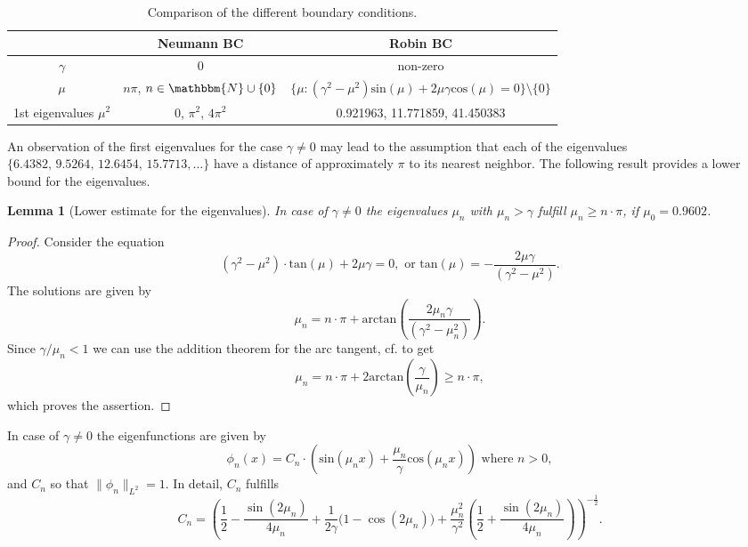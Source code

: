 \documentclass[a4paper,11pt]{article}
\theoremstyle{plain} %
\newtheorem{lemma}{Lemma}[section]
\theoremstyle{definition} %
\theoremstyle{remark} %
\theoremstyle{remark}
\begin{document}
\begin{table}[h!] 
\centering
{ \renewcommand{\arraystretch}{1.4}
\begin{tabular}{ccc}
\toprule
& \textbf{Neumann BC} & \textbf{Robin BC}\\
\midrule
$\gamma $ & 0 & non-zero\\
$\mu $ & $ n \pi$, $ n\in \mathbbm{N}\cup \{ 0 \} $ & $ \{ \mu : (\gamma^2  - \mu^2) \mathrm{sin}(\mu ) + 2 \mu \gamma \mathrm{cos}(\mu ) =0  \}\setminus \{ 0 \} $ \\
1st eigenvalues $\mu^2 $  & 0, $\pi^2 $, $ 4 \pi^2 $ & 0.921963, 11.771859, 41.450383 \\
\bottomrule
\end{tabular}}
\caption{Comparison of the different boundary conditions.}
\label{ComparisonBC}
\end{table}
An observation of the first eigenvalues for the case $\gamma \not= 0 $ may lead to the assumption that each of the eigenvalues $ \{ 6.4382,\, 9.5264,\, 12.6454,\, 15.7713,\dots \} $ have a distance of approximately $ \pi $ to its nearest neighbor. The following result provides a lower bound for the eigenvalues.
\begin{lemma}[Lower estimate for the eigenvalues] \label{lb_eig_vals}
In case of $\gamma \not= 0 $ the eigenvalues $\mu_n $ with $ \mu_n > \gamma $ fulfill $ \mu_n \geq n\cdot \pi $, if $ \mu_0 = 0.9602 $.
\end{lemma}

\begin{proof}
Consider the equation 
\begin{equation*}
\left( \gamma^2 - \mu^2 \right) \cdot \mathrm{tan}(\mu ) + 2\mu\gamma = 0 , \text{ or } \mathrm{tan}(\mu ) = -\frac{2\mu\gamma}{\left( \gamma^2 - \mu^2 \right)} .%
\end{equation*}
The solutions are given by
\begin{equation*}
\mu_n = n\cdot\pi + \mathrm{arctan}\left(\frac{2\mu_n\gamma}{\left( \gamma^2 - \mu_n^2 \right)}\right) .
\end{equation*}
Since $\gamma / \mu_n < 1 $ we can use the addition theorem for the arc tangent, cf. \cite[p. 237]{bronstein1980taschenbuch} to get
\begin{equation*}
\mu_n = n\cdot\pi + 2 \mathrm{arctan}\left(\frac{\gamma}{\mu_n}\right) \geq n\cdot\pi ,
\end{equation*}
which proves the assertion.
\end{proof}

In case of $\gamma \not= 0 $ the eigenfunctions are given by
\begin{equation} \label{ONB1}
\phi_n (x) = C_n \cdot \left(\mathrm{sin} (\mu_n x) + \frac{\mu_n }{\gamma } \mathrm{cos} (\mu_n x) \right) \text{ where } n>0 ,
\end{equation}
and $C_n $ so that $ \| \phi_n \|_{L^2} = 1 $. In detail, $C_n $ fulfills
\begin{equation}
C_n = \left(
    \frac{1}{2}
    - \frac{\sin(2\mu_n)}{4\mu_n}
    + \frac{1}{2\gamma}\bigl(1 - \cos(2\mu_n)\bigr)
    + \frac{\mu_n^2}{\gamma^2}
      \left(\frac{1}{2} + \frac{\sin(2\mu_n)}{4\mu_n}\right)
\right)^{-\tfrac{1}{2}}.
\end{equation}
\end{document}
